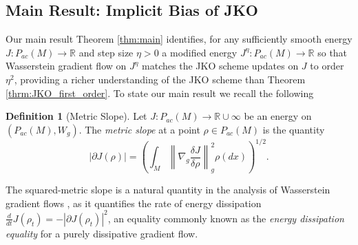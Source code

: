\documentclass[reqno,11pt,letterpaper]{amsart}
\theoremstyle{plain}
\theoremstyle{definition}
\newtheorem{definition}{Definition}
\theoremstyle{remark}
\newcommand{\gives}{\rightarrow}
\newcommand{\R}{\mathbb R}
\begin{document}
\subsection{Main Result: Implicit Bias of JKO}



Our main result Theorem \ref{thm:main} identifies, for any sufficiently smooth energy $J:P_{ac}(M)\gives \R$ and step size $\eta>0$ a modified energy $J^\eta: P_{ac}(M)\gives \R$ so that Wasserstein gradient flow on $J^\eta$ matches the JKO scheme updates on $J$ to order $\eta^2$, providing a richer understanding of the JKO scheme than Theorem \ref{thrm:JKO_first_order}. To state our main result we recall the following

\begin{definition}[Metric Slope]\label{eq:metric_slope}
    Let $J: P_{ac}(M) \to \mathbb{R} \cup \infty$ be an energy on $({P}_{ac}(M), W_{g})$. The \emph{metric slope} at a point $\rho \in {P}_{ac}(M)$ is the quantity
    \[
    |\partial J(\rho)| = \left(\int_{M} \left\lVert
    \nabla_g \frac{\delta J}{\delta \rho}
    \right\rVert_{g}^{2} \rho(dx) \right)^{1/2}.
    \]
\end{definition}
The squared-metric slope is a natural quantity in the analysis of Wasserstein gradient flows \cite{AGS2008, Villani2003}, as it quantifies the rate of energy dissipation $\frac{d}{dt} J(\rho_{t}) = - |\partial J(\rho_{t})|^{2}$, an equality commonly known as the \emph{energy dissipation equality} for a purely dissipative gradient flow.
\end{document}

